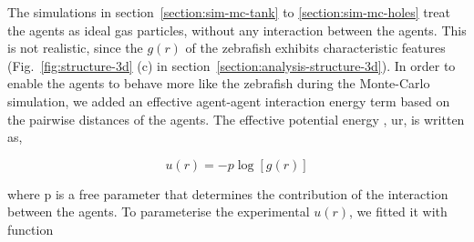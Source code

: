\documentclass[11pt,twoside]{report}
\begin{document}

The simulations in section~\ref{section:sim-mc-tank} to \ref{section:sim-mc-holes} treat the agents as ideal gas particles, without any interaction between the agents. This is not realistic, since the $g(r)$ of the zebrafish exhibits characteristic features (Fig.~\ref{fig:structure-3d} (c) in section~\ref{section:analysis-structure-3d}).
In order to enable the agents to behave more like the zebrafish during the Monte-Carlo simulation, we added an effective agent-agent interaction energy term based on the pairwise distances of the agents. The effective potential energy
, \gls{ur}, is written as,

\begin{equation*}
	u(r) = -p \log\left[ g(r) \right]
\end{equation*}

\noindent where \gls{p} is a free parameter that determines the contribution of the interaction between the agents. To parameterise the experimental $u(r)$, we fitted it with function
\end{document}
